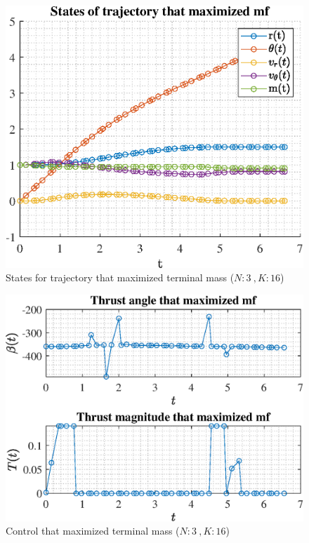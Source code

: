 \documentclass[]{article}
\begin{document}
	\begin{figure}
		\centering
		\includegraphics[scale=0.75]{states_N3_K16_C2_mf.eps}
		\caption{States for trajectory that maximized terminal mass (\(N:3\ , K:16\))}
		\label{fig:states_N3_K16_C2_mf}
	\end{figure}
	\begin{figure}
		\centering
		\includegraphics[scale=0.75]{control_N3_K16_C2_mf.eps}
		\caption{Control that maximized terminal mass (\(N:3\ , K:16\))}
		\label{fig:control_N3_K16_C2_mf}
	\end{figure}
\end{document}
